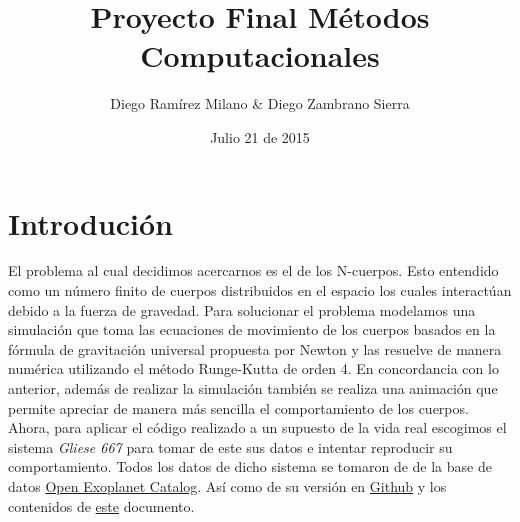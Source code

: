 \documentclass[11pt,a4paper]{article}
\author{Diego Ramírez Milano \& Diego Zambrano Sierra}
\title{Proyecto Final Métodos Computacionales}
\date{Julio 21 de 2015}
\begin{document}
\maketitle
 
\section{\label{intro}Introdución}
{
El problema al cual decidimos acercarnos es el de los N-cuerpos. Esto entendido como un número finito de cuerpos distribuidos en el espacio los cuales interactúan debido a la fuerza de gravedad. Para solucionar el problema modelamos una simulación que toma las ecuaciones de movimiento de los cuerpos basados en la fórmula de gravitación universal propuesta por Newton y las resuelve de manera numérica utilizando el método Runge-Kutta de orden 4. En concordancia con lo anterior, además de realizar la simulación también se realiza una animación que permite apreciar de manera más sencilla el comportamiento de los cuerpos.\\

Ahora, para aplicar el código realizado a un supuesto de la vida real escogimos el sistema \textit{Gliese 667} para tomar de este sus datos e intentar reproducir su comportamiento. Todos los datos de dicho sistema se tomaron de de la base de datos \href{http://www.openexoplanetcatalogue.com/}{Open Exoplanet Catalog}. Así como de su versión en \href{https://github.com/OpenExoplanetCatalogue/open_exoplanet_catalogue}{Github} y los contenidos de \href{http://www.contact-conference.com/images/c12COTIsys.pdf}{este} documento.\\
}
\end{document}
